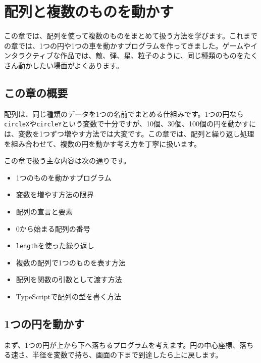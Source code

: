 \chapter{配列と複数のものを動かす}
\label{chap:arrays-and-many-objects}

この章では、配列を使って複数のものをまとめて扱う方法を学びます。これまでの章では、1つの円や1つの車を動かすプログラムを作ってきました。ゲームやインタラクティブな作品では、敵、弾、星、粒子のように、同じ種類のものをたくさん動かしたい場面がよくあります。

\section{この章の概要}

配列は、同じ種類のデータを1つの名前でまとめる仕組みです。1つの円なら\texttt{circleX}や\texttt{circleY}という変数で十分ですが、10個、30個、100個の円を動かすには、変数を1つずつ増やす方法では大変です。この章では、配列と繰り返し処理を組み合わせて、複数の円を動かす考え方を丁寧に扱います。

この章で扱う主な内容は次の通りです。

\begin{itemize}
    \item 1つのものを動かすプログラム
    \item 変数を増やす方法の限界
    \item 配列の宣言と要素
    \item 0から始まる配列の番号
    \item \texttt{length}を使った繰り返し
    \item 複数の配列で1つのものを表す方法
    \item 配列を関数の引数として渡す方法
    \item TypeScriptで配列の型を書く方法
\end{itemize}

\section{1つの円を動かす}

まず、1つの円が上から下へ落ちるプログラムを考えます。円の中心座標、落ちる速さ、半径を変数で持ち、画面の下まで到達したら上に戻します。

\begin{listing}[htbp]
\inputminted{ts}{typescript-p5/listings/chapter10/single-falling-circle.ts}
\caption{1つの円を上から下へ動かす（\texttt{chapter10/single-falling-circle.ts}）}
\label{lst:chapter10-single-falling-circle}
\end{listing}

